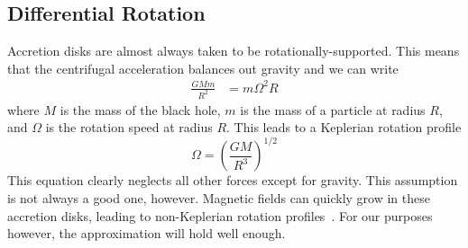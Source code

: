 \subsection{Differential Rotation} \label{ssec:difrot}
Accretion disks are almost always taken to be rotationally-supported. This means that the centrifugal acceleration balances out gravity and we can write
\begin{align*}
  \frac{GMm}{R^2}&=m\Omega^2R
\end{align*}
where $M$ is the mass of the black hole, $m$ is the mass of a particle at radius $R$, and $\Omega$ is the rotation speed at radius $R$. This leads to a Keplerian rotation profile
\begin{equation}
  \Omega=\left(\frac{GM}{R^3}\right)^{1/2}
\end{equation}
This equation clearly neglects all other forces except for gravity. This assumption is not always a good one, however. Magnetic fields can quickly grow in these accretion disks, leading to non-Keplerian rotation profiles~\cite{Salvesen2016}. For our purposes however, the approximation will hold well enough. 

